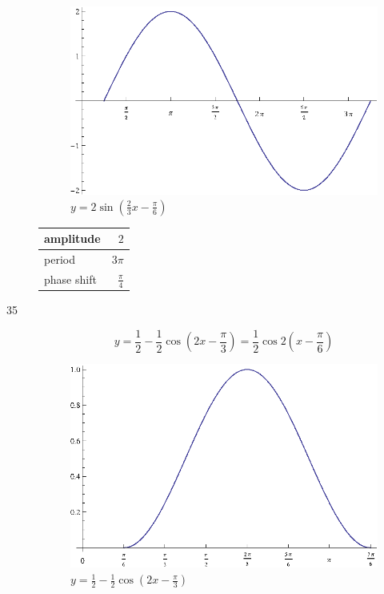 \documentclass{exam}
\begin{document}
\begin{description}
        \begin{figure}[H]
          \centering
          \includegraphics[scale=1.0]{exercise34.eps}
          \caption{$y = 2 \sin \left( \frac{2}{3} x - \frac{\pi}{6} \right)$}
        \end{figure}

        \begin{tabular}[H]{lr}
          \toprule
          amplitude & $2$ \\
          \midrule
          period & $3 \pi$ \\
          \midrule
          phase shift & $\frac{\pi}{4}$ \\
          \bottomrule
        \end{tabular}

      \pagebreak

      \item[35]
        \[
          y = \frac{1}{2} - \frac{1}{2} \cos \left( 2x - \frac{\pi}{3} \right) = \frac{1}{2} \cos 2 \left( x - \frac{\pi}{6} \right)
        \]

        \begin{figure}[H]
          \centering
          \includegraphics[scale=1.0]{exercise35.eps}
          \caption{$y = \frac{1}{2} - \frac{1}{2} \cos \left( 2x - \frac{\pi}{3} \right)$}
        \end{figure}


\end{description}
\end{document}
